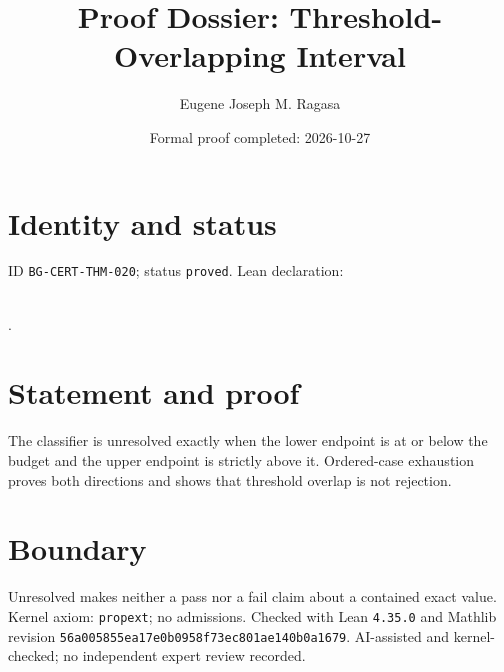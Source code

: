 \documentclass[11pt]{article}
\title{Proof Dossier: Threshold-Overlapping Interval}\author{Eugene Joseph M. Ragasa}\date{Formal proof completed: 2026-10-27}
\begin{document}
\maketitle
\section{Identity and status}
ID \texttt{BG-CERT-THM-020}; status \texttt{proved}. Lean declaration:
\par{}\\
{\tiny{}}.
\section{Statement and proof}
The classifier is unresolved exactly when the lower endpoint is at or below the budget
and the upper endpoint is strictly above it. Ordered-case exhaustion proves both
directions and shows that threshold overlap is not rejection.
\section{Boundary}
Unresolved makes neither a pass nor a fail claim about a contained exact value. Kernel
axiom: \texttt{propext}; no admissions. Checked with Lean \texttt{4.35.0} and Mathlib
revision \texttt{56a005855ea17e0b0958f73ec801ae140b0a1679}. AI-assisted and
kernel-checked; no independent expert review recorded.
\end{document}
